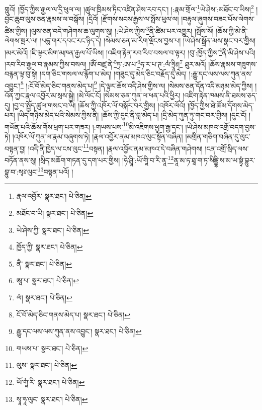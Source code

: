 གླུའོ། །ཁྱོད་ཀྱིས་རྒྱལ་ལ་དྲི་ཕུལ་ལ། །ཚུལ་ཁྲིམས་ཏིང་འཛིན་ཤེས་རབ་དང་། །:རྣམ་གྲོལ་\footnote{རྣལ་འབྱོར་  སྣར་ཐང་།  པེ་ཅིན། }ཡེ་ཤེས་:མཐོང་བ་ཡིས།\footnote{མཐོང་བ་ཡི།  སྣར་ཐང་།  པེ་ཅིན། } །བྱང་ཆུབ་ལུས་ཅན་རྣམས་ལ་བསྒོས། །དྲིའོ། །རྫོགས་སངས་རྒྱས་ལ་སྤོས་ཕུལ་ལ། །བརྟུལ་ཞུགས་བཟང་པོས་ལེགས་ཚིམ་གྱིས། །ལུས་ཅན་བདེ་གཤེགས་ཆ་ལུགས་སུ། །:ཡེ་ཤེས་ཀྱིས་\footnote{ཡེ་ཤེས་ཀྱི་  སྣར་ཐང་།  པེ་ཅིན། }ནི་ཚིམ་པར་འགྱུར། །སྤོས་སོ། །ཆོས་ཀྱི་མེ་ནི་ལེགས་སྦར་ལ། །པདྨ་གར་དབང་རང་ཉིད་དེ། །སེམས་ཅན་མ་རིག་ལྡོངས་བྱས་པ། །ཡེ་ཤེས་སྒྲོན་མས་སྣང་བར་གྱིས། །མར་མེའོ། །ཇི་ལྟར་མིག་མཁན་རྒྱལ་པོ་ཡིས། །འཇིག་རྟེན་རབ་རིབ་བསལ་བ་ལྟར། །བུ་:ཁྱོད་ཀྱིས་\footnote{ཁྱོད་ཀྱི་  སྣར་ཐང་།  པེ་ཅིན། }ནི་མི་ཤེས་པའི། །རབ་རིབ་རྒྱལ་བ་རྣམས་ཀྱིས་བསལ། །ཨོཾ་བཛྲ་ནེ་\footnote{ནཻ་  སྣར་ཐང་།  པེ་ཅིན། }ཏྲ་:ཨ་པ་\footnote{ཨཱ་པ་  སྣར་ཐང་།  པེ་ཅིན། }ཧ་ར་པ་ཊ་:ལཾ་ཧྲཱིཿ།\footnote{ལཾ།  སྣར་ཐང་།  པེ་ཅིན། } ཐུར་མའོ། །ཆོས་རྣམས་གཟུགས་བརྙན་ལྟ་བུ་སྟེ། །དག་ཅིང་གསལ་ལ་རྙོག་པ་མེད། །གཟུང་དུ་མེད་ཅིང་བརྗོད་དུ་མེད། །:རྒྱུ་དང་ལས་ལས་ཀུན་ནས་འབྱུང་།\footnote{ངོ་བོ་མེད་ཅིང་གནས་མེད་པ།  སྣར་ཐང་།  པེ་ཅིན། } །:ངོ་བོ་མེད་ཅིང་གནས་མེད་པ།\footnote{རྒྱུ་དང་ལས་ལས་ཀུན་ནས་འབྱུང་།  སྣར་ཐང་།  པེ་ཅིན། } །དེ་ལྟར་ཆོས་འདི་ཤེས་གྱིས་ལ། །སེམས་ཅན་དོན་འདི་མཉམ་མེད་ཀྱིས། །འོན་ཀྱང་རྣལ་འབྱོར་མ་སྲས་སྐྱེ། །མེ་ལོང་ངོ། །སེམས་ཅན་ཀུན་ལ་ཕན་པའི་ཕྱིར། །འཇིག་རྟེན་ཁམས་ནི་ཐམས་ཅད་དུ། །བྱ་བ་སྤྱོད་ཚུལ་གསང་བ་ཡི། །ཆོས་ཀྱི་འཁོར་ལོ་བསྐོར་བར་གྱིས། །འཁོར་ལོའོ། །ཁྱོད་ཀྱིས་ཐེ་ཚོམ་དོགས་མེད་པར། །ཡིད་གཉིས་མེད་པའི་སེམས་ཀྱིས་ནི། །ཆོས་ཀྱི་དུང་ནི་བླ་མེད་པ། །དྲི་མེད་ཀུན་ཏུ་གང་བར་གྱིས། །དུང་ངོ། །གཡོན་པའི་ཆོས་གོས་ཕྲག་པར་གཟར། །:གཡས་པས་\footnote{གཡས་པ་  སྣར་ཐང་།  པེ་ཅིན། }མི་འཇིགས་ཕྱག་རྒྱ་དང་། །ཡེ་ཤེས་མཁའ་འགྲོ་བདག་བྱས་ཏེ། །འཁོར་ལོ་ཀུན་ལ་རྣམ་བཞུགས་ཏེ། །རྣལ་འབྱོར་ནམ་མཁའ་ལུང་སྟོན་བཞིན། །མགྲིན་གཅིག་བཞིན་དུ་ལུང་བསྟན་བྱ། །འདི་ནི་ཁྱེད་ལ་ངས་ལུང་\footnote{ལུས་  སྣར་ཐང་།  པེ་ཅིན། }བསྟན། །རྣལ་འབྱོར་ནམ་མཁའ་དེ་བཞིན་གཤེགས། །ངན་འགྲོ་སྲིད་ལས་བཏོན་ནས་སུ། །སྲིད་མཆོག་གཏན་དུ་དག་པར་གྱིས། །ཧེ་ཤྲཱི་:ཡོ་གཱི་བ་རི་ནཱ་\footnote{ཡོ་གཱཾ་རི་  སྣར་ཐང་།  པེ་ཅིན། }ནཱ་མ་ཏ་ཐཱ་ག་ཏ་སིདྡྷི་ས་མ་ཡ་སྟྭཾ་བྷུར་བྷུ་བ་:སྭཿ་ལུང་\footnote{སྭཱ་ཧཱ་ལུང་  སྣར་ཐང་།  པེ་ཅིན། }བསྟན་པའོ། །
